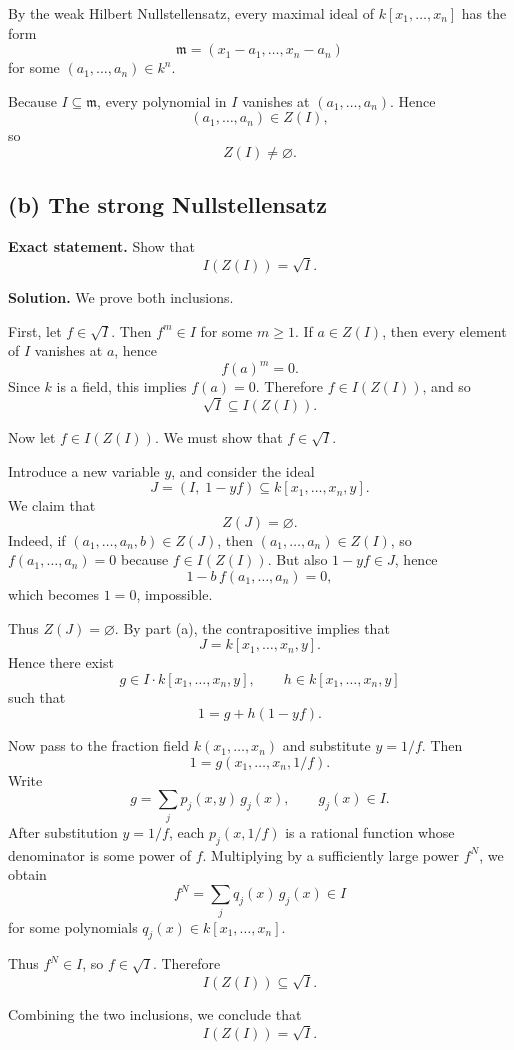 \documentclass[12pt,a4paper]{article}
\theoremstyle{notespace}
\begin{document}
By the weak Hilbert Nullstellensatz, every maximal ideal of \(k[x_1,\dots,x_n]\) has the form
\[
\mathfrak m=(x_1-a_1,\dots,x_n-a_n)
\]
for some \((a_1,\dots,a_n)\in k^n\).

Because \(I\subseteq \mathfrak m\), every polynomial in \(I\) vanishes at \((a_1,\dots,a_n)\). Hence
\[
(a_1,\dots,a_n)\in Z(I),
\]
so
\[
Z(I)\neq\varnothing.
\]

\subsection*{(b) The strong Nullstellensatz}

\textbf{Exact statement.}
Show that
\[
I(Z(I))=\sqrt I.
\]

\textbf{Solution.}
We prove both inclusions.

First, let \(f\in \sqrt I\). Then \(f^m\in I\) for some \(m\ge 1\). If \(a\in Z(I)\), then every element of \(I\) vanishes at \(a\), hence
\[
f(a)^m=0.
\]
Since \(k\) is a field, this implies \(f(a)=0\). Therefore \(f\in I(Z(I))\), and so
\[
\sqrt I\subseteq I(Z(I)).
\]

Now let \(f\in I(Z(I))\). We must show that \(f\in \sqrt I\).

Introduce a new variable \(y\), and consider the ideal
\[
J=(I,\;1-yf)\subseteq k[x_1,\dots,x_n,y].
\]
We claim that
\[
Z(J)=\varnothing.
\]
Indeed, if \((a_1,\dots,a_n,b)\in Z(J)\), then \((a_1,\dots,a_n)\in Z(I)\), so \(f(a_1,\dots,a_n)=0\) because \(f\in I(Z(I))\). But also \(1-yf\in J\), hence
\[
1-b\,f(a_1,\dots,a_n)=0,
\]
which becomes \(1=0\), impossible.

Thus \(Z(J)=\varnothing\). By part (a), the contrapositive implies that
\[
J=k[x_1,\dots,x_n,y].
\]
Hence there exist
\[
g\in I\cdot k[x_1,\dots,x_n,y],\qquad h\in k[x_1,\dots,x_n,y]
\]
such that
\[
1=g+h(1-yf).
\]

Now pass to the fraction field \(k(x_1,\dots,x_n)\) and substitute \(y=1/f\). Then
\[
1=g(x_1,\dots,x_n,1/f).
\]
Write
\[
g=\sum_j p_j(x,y)\,g_j(x),
\qquad g_j(x)\in I.
\]
After substitution \(y=1/f\), each \(p_j(x,1/f)\) is a rational function whose denominator is some power of \(f\). Multiplying by a sufficiently large power \(f^N\), we obtain
\[
f^N=\sum_j q_j(x)\,g_j(x)\in I
\]
for some polynomials \(q_j(x)\in k[x_1,\dots,x_n]\).

Thus \(f^N\in I\), so \(f\in \sqrt I\). Therefore
\[
I(Z(I))\subseteq \sqrt I.
\]

Combining the two inclusions, we conclude that
\[
I(Z(I))=\sqrt I.
\]
\end{document}
